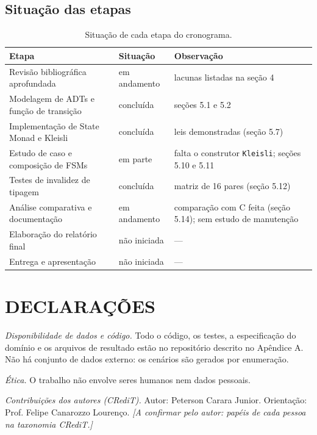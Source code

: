 \documentclass[12pt,a4paper]{article}
\begin{document}
\subsection*{Situação das etapas}

\begin{table}[h]
\centering
\footnotesize
\begin{tabular}{|p{6.2cm}|p{2.6cm}|p{6.2cm}|}
\hline
Etapa & Situação & Observação \\
\hline
Revisão bibliográfica aprofundada & em andamento & lacunas listadas na seção 4 \\
\hline
Modelagem de ADTs e função de transição & concluída & seções 5.1 e 5.2 \\
\hline
Implementação de State Monad e Kleisli & concluída & leis demonstradas (seção 5.7) \\
\hline
Estudo de caso e composição de FSMs & em parte & falta o construtor \texttt{Kleisli}; seções 5.10 e 5.11 \\
\hline
Testes de invalidez de tipagem & concluída & matriz de 16 pares (seção 5.12) \\
\hline
Análise comparativa e documentação & em andamento & comparação com C feita (seção 5.14); sem estudo de manutenção \\
\hline
Elaboração do relatório final & não iniciada & --- \\
\hline
Entrega e apresentação & não iniciada & --- \\
\hline
\end{tabular}
\caption{Situação de cada etapa do cronograma.}
\end{table}



\section*{DECLARAÇÕES}

\textit{Disponibilidade de dados e código.} Todo o código, os testes, a especificação do domínio e os arquivos de resultado estão no repositório descrito no Apêndice A. Não há conjunto de dados externo: os cenários são gerados por enumeração.

\textit{Ética.} O trabalho não envolve seres humanos nem dados pessoais.

\textit{Contribuições dos autores (CRediT).} Autor: Peterson Carara Junior. Orientação: Prof. Felipe Canarozzo Lourenço. \textit{[A confirmar pelo autor: papéis de cada pessoa na taxonomia CRediT.]}
\end{document}
